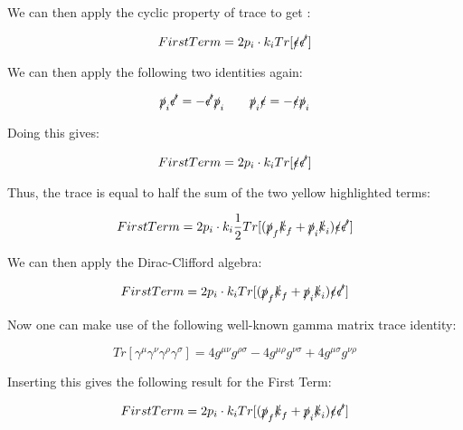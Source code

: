 \documentclass[a4]{article}
\begin{document}
    We can then apply the cyclic property of trace to get :

    \begin{equation}
        First Term = 2 p_i \cdot k_i Tr[\slashed{\epsilon} \slashed{\epsilon'}]
    \end{equation}

    We can then apply the following two identities again:

    \begin{equation}
        \slashed{p}_i \slashed{\epsilon'} = - \slashed{\epsilon'} \slashed{p}_i \qquad \slashed{p}_i \slashed{\epsilon} = - \slashed{\epsilon} \slashed{p}_i
    \end{equation}

    Doing this gives:

    \begin{equation}
        First Term = 2 p_i \cdot k_i Tr[\slashed{\epsilon} \slashed{\epsilon'}]
    \end{equation}

    Thus, the trace is equal to half the sum of the two yellow highlighted terms:

    \begin{equation}
        First Term = 2 p_i \cdot k_i \frac{1}{2} Tr[(\slashed{p}_f \slashed{k}_f + \slashed{p}_i \slashed{k}_i) \slashed{\epsilon} \slashed{\epsilon'}]
    \end{equation}

    We can then apply the Dirac-Clifford algebra:

    \begin{equation}
        First Term = 2 p_i \cdot k_i Tr[(\slashed{p}_f \slashed{k}_f + \slashed{p}_i \slashed{k}_i) \slashed{\epsilon} \slashed{\epsilon'}]
    \end{equation}

    Now one can make use of the following well-known gamma matrix trace identity:

    \begin{equation}
        Tr [\gamma^\mu \gamma^\nu \gamma^\rho \gamma^\sigma] = 4 g^{\mu \nu} g^{\rho \sigma} - 4 g^{\mu \rho} g^{\nu \sigma} + 4 g^{\mu \sigma} g^{\nu \rho}
    \end{equation}

    Inserting this gives the following result for the First Term:

    \begin{equation}
        First Term = 2 p_i \cdot k_i Tr[(\slashed{p}_f \slashed{k}_f + \slashed{p}_i \slashed{k}_i) \slashed{\epsilon} \slashed{\epsilon'}]
    \end{equation}
\end{document}
